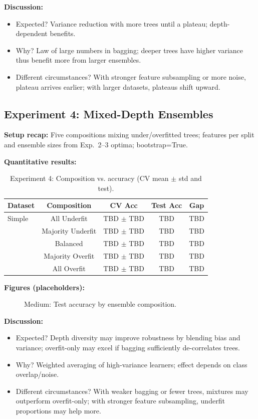 \documentclass[conference]{IEEEtran}
\begin{document}
\textbf{Discussion:}
\begin{itemize}
  \item Expected? Variance reduction with more trees until a plateau; depth-dependent benefits.
  \item Why? Law of large numbers in bagging; deeper trees have higher variance thus benefit more from larger ensembles.
  \item Different circumstances? With stronger feature subsampling or more noise, plateau arrives earlier; with larger datasets, plateaus shift upward.
\end{itemize}

\subsection{Experiment 4: Mixed-Depth Ensembles}
\label{sec:results-exp4}
\textbf{Setup recap:} Five compositions mixing under/overfitted trees; features per split and ensemble sizes from Exp.~2--3 optima; bootstrap=True.

\textbf{Quantitative results:}
\begin{table}[h]
\centering
\caption{Experiment 4: Composition vs. accuracy (CV mean $\pm$ std and test).}
\label{tab:exp4-mixed}
\begin{tabular}{lcccc}
\toprule
Dataset & Composition & CV Acc & Test Acc & Gap \\
\midrule
Simple  & All Underfit      & TBD $\pm$ TBD & TBD & TBD \\
        & Majority Underfit & TBD $\pm$ TBD & TBD & TBD \\
        & Balanced          & TBD $\pm$ TBD & TBD & TBD \\
        & Majority Overfit  & TBD $\pm$ TBD & TBD & TBD \\
        & All Overfit       & TBD $\pm$ TBD & TBD & TBD \\
\bottomrule
\end{tabular}
\end{table}

\textbf{Figures (placeholders):}
\begin{figure}[h]
  \centering
  \caption{Medium: Test accuracy by ensemble composition.}
  \label{fig:exp4-medium-bars}
\end{figure}

\textbf{Discussion:}
\begin{itemize}
  \item Expected? Depth diversity may improve robustness by blending bias and variance; overfit-only may excel if bagging sufficiently de-correlates trees.
  \item Why? Weighted averaging of high-variance learners; effect depends on class overlap/noise.
  \item Different circumstances? With weaker bagging or fewer trees, mixtures may outperform overfit-only; with stronger feature subsampling, underfit proportions may help more.
\end{itemize}
\end{document}

